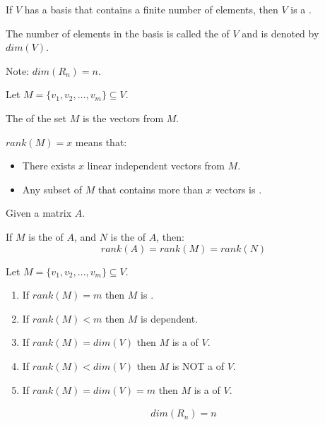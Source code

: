     \par If $V$ has a basis that contains a finite number of elements, then
      $V$ is a .
    \par The number of elements in the basis is called the  of
      $V$ and is denoted by $dim(V)$.
    \par Note: $dim(R_{n}) = n$.


    \par Let $M = \{v_{1}, v_{2}, \ldots, v_{m}\} \subseteq V$.
    \par The  of the set $M$ is the  vectors from $M$.
    \par $rank(M) = x$ means that:
    \begin{itemize}
      \item There exists $x$ linear independent vectors from $M$.
      \item Any subset of $M$ that contains more than $x$ vectors
      is .
    \end{itemize}

    \par Given a matrix $A$.
    \par If $M$ is the  of $A$, and
            $N$ is the  of $A$, then:
    \[
      rank(A) = rank(M) = rank(N)
    \]

    \par Let $M = \{v_{1}, v_{2}, \ldots, v_{m}\} \subseteq V$.
    \begin{enumerate}
      \item If $rank(M) = m$ then $M$ is .
      \item If $rank(M) < m$ then $M$ is dependent.
      \item If $rank(M) = dim(V)$ then $M$ is a  of $V$.
      \item If $rank(M) < dim(V)$ then $M$ is NOT a  of $V$.
      \item If $rank(M) = dim(V) = m$ then $M$ is a  of $V$.
    \end{enumerate}


    \begin{align*}
      dim(R_{n}) = n \\
    \end{align*}

